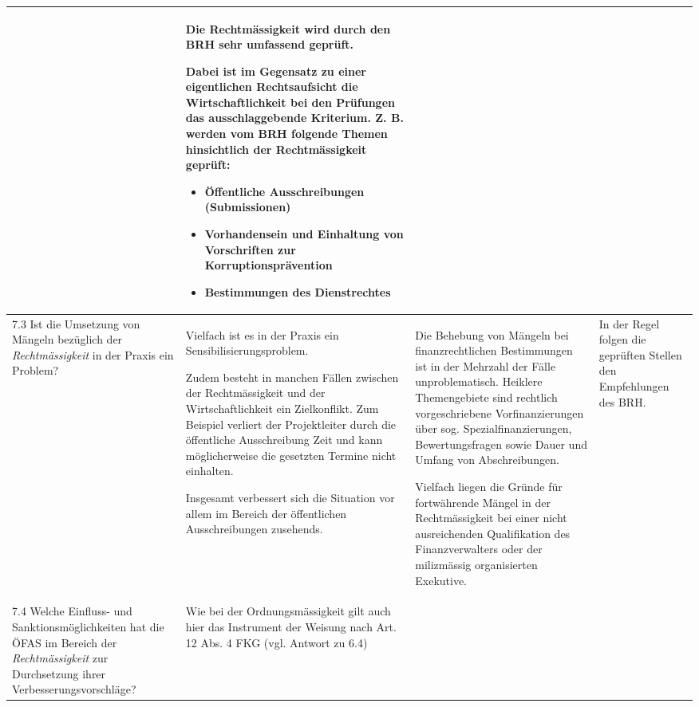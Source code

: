 \documentclass[10pt]{article}
\begin{document}
\begin{landscape}
\begin{center}
\begin{longtable}{|p{4cm}|p{5cm}|p{7.5cm}|p{7.5cm}|}
 & Die Rechtmässigkeit wird durch den BRH sehr umfassend geprüft. 

Dabei ist im Gegensatz zu einer eigentlichen Rechts­aufsicht die Wirtschaftlichkeit bei den Prüfungen das ausschlag­gebende Kriterium. Z. B. werden vom BRH folgende Themen hinsichtlich der Recht­mässigkeit geprüft:

\begin{itemize}
    \item Öffentliche Ausschreibungen (Submissionen)

    \item Vorhandensein und Einhaltung von Vorschriften zur Korruptionsprävention

    \item Bestimmungen des Dienstrechtes

\end{itemize}

 \\
\hline
7.3 Ist die Umsetzung von Mängeln bezüglich der \textit{Rechtmässigkeit} in der Praxis ein Problem? & Vielfach ist es in der Praxis ein Sensibilisierungs­problem.

Zudem besteht in manchen Fällen zwischen der Rechtmässigkeit und der Wirtschaftlichkeit ein Zielkonflikt. Zum Beispiel verliert der Projektleiter durch die öffentliche Ausschreibung Zeit und kann möglicherweise die gesetzten Termine nicht einhalten.

Insgesamt verbessert sich die Situation vor allem im Bereich der öffentlichen Ausschreibungen zusehends.

 & Die Behebung von Mängeln bei finanzrechtlichen Bestimmungen ist in der Mehrzahl der Fälle unproblema­tisch. Heiklere Themengebiete sind rechtlich vorgeschriebene Vorfinan­zierungen über sog. Spezial­finanzierungen, Bewertungsfragen sowie Dauer und Umfang von Abschrei­bungen.

Vielfach liegen die Gründe für fortwährende Mängel in der Rechtmässigkeit bei einer nicht ausreichenden Qualifikation des Finanzverwalters oder der milizmässig organisierten Exekutive.

 & In der Regel folgen die geprüften Stellen den Empfehlungen des BRH. \\
\hline
7.4 Welche Einfluss- und Sanktionsmöglichkeiten hat die ÖFAS im Bereich der \textit{Rechtmässigkeit} zur Durchsetzung ihrer Verbesserungsvorschläge? & Wie bei der Ordnungsmässigkeit gilt auch hier das Instrument der Weisung nach Art. 12 Abs. 4 FKG (vgl. Antwort zu 6.4)


\end{longtable}
\end{center}
\end{landscape}
\end{document}
